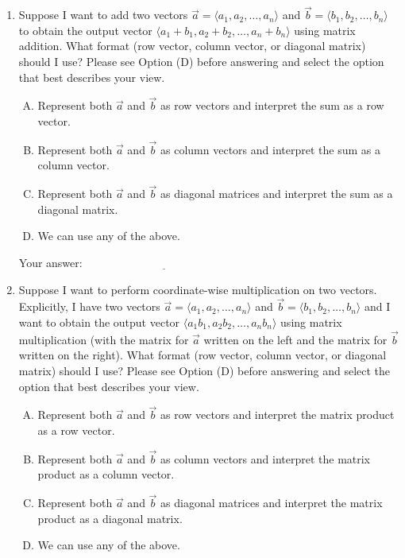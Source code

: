 \documentclass[10pt]{amsart}
\begin{document}
\begin{enumerate}
\item Suppose I want to add two vectors $\vec{a} = \langle a_1, a_2,\dots,a_n
  \rangle$ and $\vec{b} = \langle b_1,b_2,\dots,b_n \rangle$ to obtain the
  output vector $\langle a_1 + b_1, a_2 + b_2, \dots, a_n + b_n
  \rangle$ using matrix addition. What format (row vector, column
  vector, or diagonal matrix) should I use? Please see Option (D)
  before answering and select the option that best describes your view.

  \begin{enumerate}[(A)]
  \item Represent both $\vec{a}$ and $\vec{b}$ as row vectors and
    interpret the sum as a row vector.
  \item Represent both $\vec{a}$ and $\vec{b}$ as column vectors and
    interpret the sum as a column vector.
  \item Represent both $\vec{a}$ and $\vec{b}$ as diagonal matrices and
    interpret the sum as a diagonal matrix.
  \item We can use any of the above.
  \end{enumerate}

  \vspace{0.1in}
  Your answer: $\underline{\qquad\qquad\qquad\qquad\qquad\qquad\qquad}$
  \vspace{0.1in}

\item Suppose I want to perform coordinate-wise multiplication on two
  vectors. Explicitly, I have two vectors $\vec{a} = \langle a_1,
  a_2,\dots,a_n \rangle$ and $\vec{b} = \langle b_1,b_2,\dots,b_n
  \rangle$ and I want to obtain the output vector $\langle a_1b_1,
  a_2b_2, \dots, a_nb_n \rangle$ using matrix multiplication (with the
  matrix for $\vec{a}$ written on the left and the matrix for
  $\vec{b}$ written on the right). What format (row vector, column
  vector, or diagonal matrix) should I use?  Please see Option (D)
  before answering and select the option that best describes your
  view.

  \begin{enumerate}[(A)]
  \item Represent both $\vec{a}$ and $\vec{b}$ as row vectors and
    interpret the matrix product as a row vector.
  \item Represent both $\vec{a}$ and $\vec{b}$ as column vectors and
    interpret the matrix product as a column vector.
  \item Represent both $\vec{a}$ and $\vec{b}$ as diagonal matrices and
    interpret the matrix product as a diagonal matrix.
  \item We can use any of the above.
  \end{enumerate}


\end{enumerate}
\end{document}
